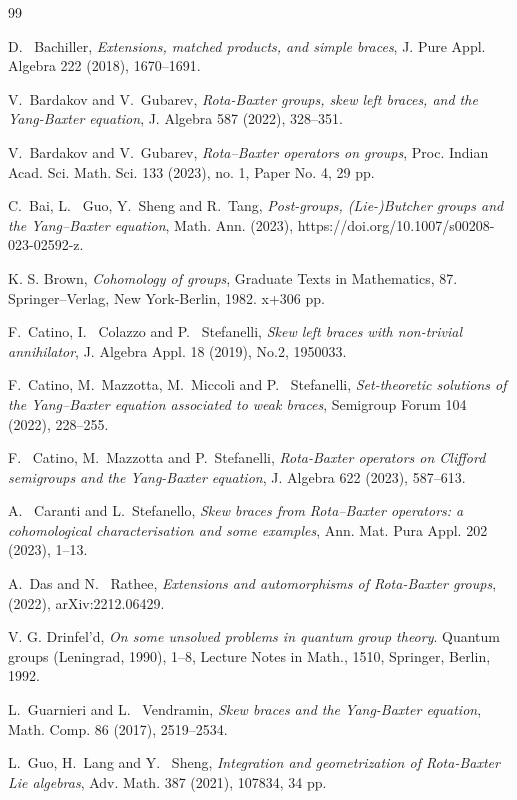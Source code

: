 \documentclass[11pt]{amsart}
\theoremstyle{thrm}
\theoremstyle{plain}
\theoremstyle{definition}
\numberwithin{equation}{section}
\begin{document}
 
\begin{thebibliography}{99}
	
D.~ Bachiller, \textit{Extensions, matched products, and simple braces}, J. Pure Appl. Algebra 222 (2018),  1670--1691.
	
 V.~Bardakov and V.~Gubarev, \textit{Rota-Baxter groups, skew left braces, and the Yang-Baxter equation},  J. Algebra 587 (2022), 328--351.

 V.~Bardakov and V.~Gubarev, \textit{Rota--Baxter operators on groups}, Proc. Indian Acad. Sci. Math. Sci. 133 (2023), no. 1, Paper No. 4, 29 pp.


C.~Bai, L.~ Guo, Y.~Sheng  and R.~Tang, \textit{Post-groups, (Lie-)Butcher groups and the Yang--Baxter equation}, Math. Ann. (2023), https://doi.org/10.1007/s00208-023-02592-z.


 K. S. Brown, \textit{Cohomology of groups}, Graduate Texts in Mathematics, 87. Springer--Verlag, New York-Berlin, 1982. x+306 pp.


F.~Catino, I.~ Colazzo and P.~ Stefanelli,  \textit{Skew left braces with non-trivial annihilator}, J. Algebra Appl. 18 (2019),  No.2, 1950033.


F.~Catino, M.~Mazzotta, M.~Miccoli and P.~ Stefanelli, \textit{Set-theoretic solutions of the Yang–Baxter equation associated to weak braces}, Semigroup Forum 104 (2022), 228--255. 


F.~ Catino, M.~Mazzotta and P.~Stefanelli, \textit{Rota-Baxter operators on Clifford semigroups and the Yang-Baxter equation}, J. Algebra 622 (2023), 587--613.

A. ~Caranti and L.~Stefanello, \textit{Skew braces from Rota–Baxter operators: a cohomological characterisation and some examples},  Ann. Mat. Pura Appl.  202 (2023), 1--13.

 A.~Das and N. ~Rathee, \textit{Extensions and automorphisms of Rota-Baxter groups}, (2022), 	arXiv:2212.06429.

 V. G. Drinfel'd, \textit{On some unsolved problems in quantum group theory}. Quantum groups (Leningrad, 1990), 1--8, Lecture Notes in Math., 1510, Springer, Berlin, 1992.


 L.~Guarnieri and L.~ Vendramin, \textit{Skew braces and the Yang-Baxter equation},  Math. Comp. 86 (2017),  2519--2534.

  L.~Guo, H.~Lang and Y.~ Sheng, \textit{Integration and geometrization of Rota-Baxter Lie algebras}, Adv. Math. 387 (2021), 107834, 34 pp.



\end{thebibliography}
\end{document}
